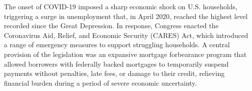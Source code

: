 \documentclass[11pt]{article}
\newcommand{\Javad}[1]{\todo[inline,linecolor=red, backgroundcolor=blue!10!white, bordercolor=red, size=\tiny]{#1}}
\begin{document}


\noindent The onset of COVID-19 imposed a sharp economic shock on U.S. households, triggering a surge in unemployment that, in April 2020, reached the highest level recorded since the Great Depression. In response, Congress enacted the Coronavirus Aid, Relief, and Economic Security (CARES) Act, which introduced a range of emergency measures to support struggling households. A central provision of the legislation was an expansive mortgage forbearance program that allowed borrowers with federally backed mortgages to temporarily suspend payments without penalties, late fees, or damage to their credit, relieving financial burden during a period of severe economic uncertainty.
\end{document}
